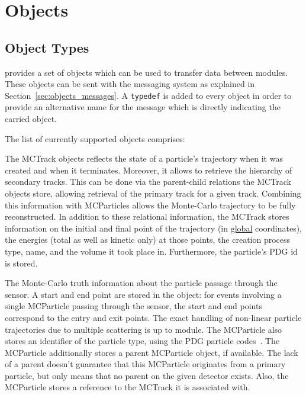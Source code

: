 \chapter{Objects}
\label{ch:objects}

\section{Object Types}
\label{sec:objtypes}

\apsq provides a set of objects which can be used to transfer data between modules.
These objects can be sent with the messaging system as explained in Section~\ref{sec:objects_messages}.
A \texttt{typedef} is added to every object in order to provide an alternative name for the message which is directly indicating the carried object.

The list of currently supported objects comprises:


The MCTrack objects reflects the state of a particle's trajectory when it was created and when it terminates.
Moreover, it allows to retrieve the hierarchy of secondary tracks.
This can be done via the parent-child relations the MCTrack objects store, allowing retrieval of the primary track for a given track. 
Combining this information with MCParticles allows the Monte-Carlo trajectory to be fully reconstructed.
In addition to these relational information, the MCTrack stores information on the initial and final point of the trajectory (in \underline{global} coordinates), the energies (total as well as kinetic only) at those points, the creation process type, name, and the volume it took place in.
Furthermore, the particle's PDG id is stored.

The Monte-Carlo truth information about the particle passage through the sensor.
A start and end point are stored in the object: for events involving a single MCParticle passing through the sensor, the start and end points correspond to the entry and exit points.
The exact handling of non-linear particle trajectories due to multiple scattering is up to module.
The MCParticle also stores an identifier of the particle type, using the PDG particle codes~\cite{pdg}.
The MCParticle additionally stores a parent MCParticle object, if available.
The lack of a parent doesn't guarantee that this MCParticle originates from a primary particle, but only means that no parent on the given detector exists.
Also, the MCParticle stores a reference to the MCTrack it is associated with.

